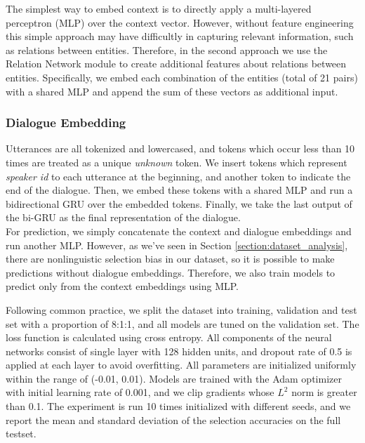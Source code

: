 \documentclass[letterpaper]{article}
\begin{document}
The simplest way to embed context is to directly apply a multi-layered perceptron (MLP) over the context vector. However, without feature engineering this simple approach may have difficultly in capturing relevant information, such as relations between entities. Therefore, in the second approach we use the Relation Network module \cite{santoro2017simple} to create additional features about relations between entities. Specifically, we embed each combination of the entities (total of 21 pairs) with a shared MLP and append the sum of these vectors as additional input.

\subsubsection{Dialogue Embedding}

Utterances are all tokenized and lowercased, and tokens which occur less than 10 times are treated as a unique \emph{unknown} token. We insert tokens which represent \emph{speaker id} to each utterance at the beginning, and another token to indicate the end of the dialogue. Then, we embed these tokens with a shared MLP and run a bidirectional GRU \cite{cho2014properties} over the embedded tokens. Finally, we take the last output of the bi-GRU as the final representation of the dialogue. \\

For prediction, we simply concatenate the context and dialogue embeddings and run another MLP. However, as we've seen in Section \ref{section:dataset_analysis}, there are nonlinguistic selection bias in our dataset, so it is possible to make predictions without dialogue embeddings. Therefore, we also train models to predict only from the context embeddings using MLP.

Following common practice, we split the dataset into training, validation and test set with a proportion of 8:1:1, and all models are tuned on the validation set. The loss function is calculated using cross entropy. All components of the neural networks consist of single layer with 128 hidden units, and dropout rate of 0.5 is applied at each layer to avoid overfitting. All parameters are initialized uniformly within the range of (-0.01, 0.01). Models are trained with the Adam optimizer \cite{kingma2014adam} with initial learning rate of 0.001, and we clip gradients whose $L^2$ norm is greater than 0.1. The experiment is run 10 times initialized with different seeds, and we report the mean and standard deviation of the selection accuracies on the full testset.
\end{document}
